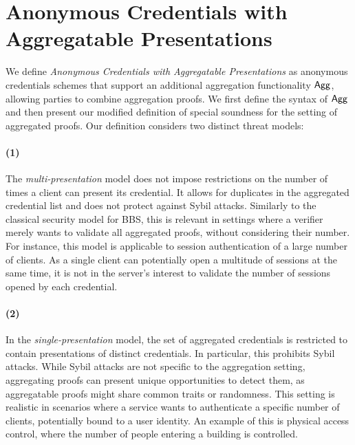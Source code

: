 \section{Anonymous Credentials with Aggregatable Presentations} \label{sec:acap}
We define \emph{Anonymous Credentials with Aggregatable Presentations} as anonymous credentials schemes that support an additional aggregation functionality $\mathsf{Agg}$, allowing parties to combine aggregation proofs. We first define the syntax of $\mathsf{Agg}$ and then present our modified definition of special soundness for the setting of aggregated proofs. Our definition considers two distinct threat models: 

\paragraph{(1)} {The \emph{multi-presentation} model does not impose restrictions on the number of times a client can present its credential. It allows for duplicates in the aggregated credential list and does not protect against Sybil attacks. Similarly to the classical security model for BBS, this is relevant in settings where a verifier merely wants to validate all aggregated proofs, without considering their number. For instance, this model is applicable to session authentication of a large number of clients. As a single client can potentially open a multitude of sessions at the same time, it is not in the server's interest to validate the number of sessions opened by each credential. 
}

\paragraph{(2)} {
In the \emph{single-presentation} model, the set of aggregated credentials is restricted to contain presentations of distinct credentials. In particular, this prohibits Sybil attacks. While Sybil attacks are not specific to the aggregation setting, aggregating proofs can present unique opportunities to detect them, as aggregatable proofs might share common traits or randomness. This setting is realistic in scenarios where a service wants to authenticate a specific number of clients, potentially bound to a user identity. An example of this is physical access control, where the number of people entering a building is controlled. 
}

